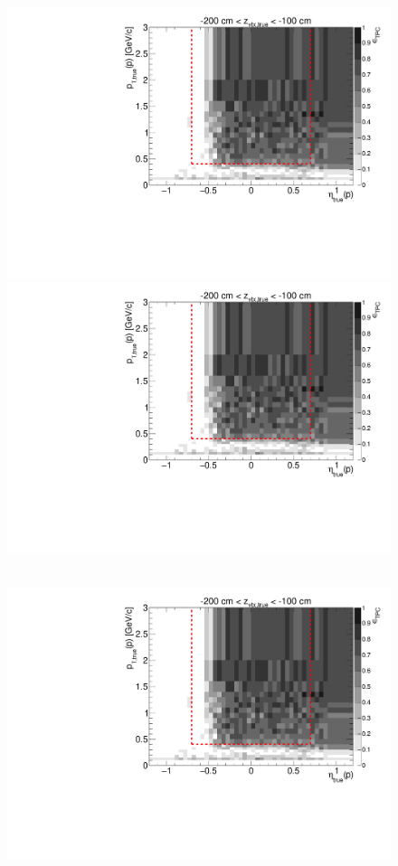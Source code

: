\begin{figure}[hb]
{  \includegraphics[width=\linewidth,page=7]{graphics/eff/Eff2D_TPC_proton_Minus.pdf}\\
  \includegraphics[width=\linewidth,page=9]{graphics/eff/Eff2D_TPC_proton_Minus.pdf}
}~
\parbox{0.495\textwidth}{
  \centering
  \includegraphics[width=\linewidth,page=4]{graphics/eff/Eff2D_TPC_proton_Minus.pdf}\\
}
\end{figure}
